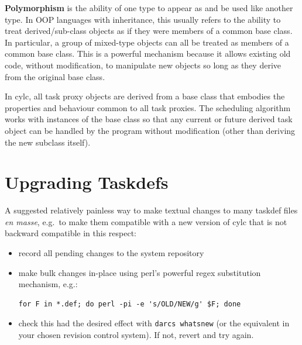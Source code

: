 \documentclass[11pt,a4paper]{article}
\begin{document}


{\bf Polymorphism} is the ability of one type to appear as and be used
like another type.  In OOP languages with inheritance, this usually
refers to the ability to treat derived/sub-class objects as if they were
members of a common base class. In particular, a group of mixed-type
objects can all be treated as members of a common base class. 
This is a powerful mechanism because it allows existing old code,
without modification, to manipulate new objects so long as they 
derive from the original base class.

In cylc, all task proxy objects are derived from a base class that 
embodies the properties and behaviour common to all task proxies. 
The scheduling algorithm works with instances of the base class so that
any current or future derived task object can be handled by the program
without modification (other than deriving the new subclass itself).


\pagebreak
\section{Upgrading Taskdefs}

A suggested relatively painless way to make textual changes to many
taskdef files {\em en masse}, e.g.\ to make them compatible with a new
version of cylc that is not backward compatible in this respect:

\begin{itemize}
    \item record all pending changes to the system repository
    \item make bulk changes in-place using perl's powerful regex 
       substitution mechanism, e.g.:
       \begin{lstlisting}
for F in *.def; do perl -pi -e 's/OLD/NEW/g' $F; done
       \end{lstlisting}
   \item check this had the desired effect with 
       \lstinline=darcs whatsnew= (or the equivalent in your chosen
       revision control system). If not, revert and try again.
\end{itemize}
\end{document}
